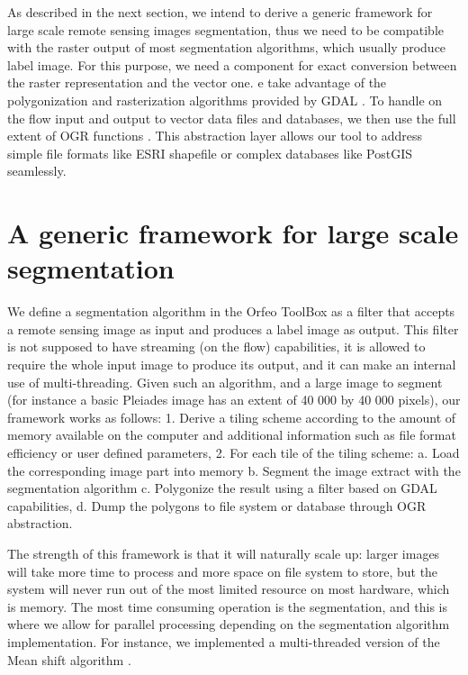 \documentclass{josis}
\begin{document}
As described in the next section, we intend to derive a generic
framework for large scale remote sensing images segmentation, thus we
need to be compatible with the raster output of most segmentation
algorithms, which usually produce label image. For this purpose, we
need a component for exact conversion between the raster
representation and the vector one. e take advantage of the
polygonization and rasterization algorithms provided by GDAL
\cite{}. To handle on the flow input and output to vector data files
and databases, we then use the full extent of OGR functions
\cite{}. This abstraction layer allows our tool to address
simple file formats like ESRI shapefile or complex databases like
PostGIS seamlessly.

\section{A generic framework for large scale segmentation}

We define a segmentation algorithm in the Orfeo ToolBox as a filter
that accepts a remote sensing image as input and produces a label
image as output. This filter is not supposed to have streaming (on the
flow) capabilities, it is allowed to require the whole input image to
produce its output, and it can make an internal use of
multi-threading. Given such an algorithm, and a large image to segment
(for instance a basic Pleiades image \cite{} has an extent of 40
000 by 40 000 pixels), our framework works as follows:
1. Derive a tiling scheme according to the amount of memory available
on the computer and additional information such as file format
efficiency or user defined parameters,
2. For each tile of the tiling scheme:
   a. Load the corresponding image part into memory
   b. Segment the image extract with the segmentation algorithm
   c. Polygonize the result using a filter based on GDAL capabilities,
   d. Dump the polygons to file system or database through OGR
      abstraction.

The strength of this framework is that it will naturally scale up:
larger images will take more time to process and more space on file
system to store, but the system will never run out of the most limited
resource on most hardware, which is memory. The most time consuming
operation is the segmentation, and this is where we allow for parallel
processing depending on the segmentation algorithm implementation. For
instance, we implemented a multi-threaded version of the Mean shift
algorithm \cite{Comaniciu2002mean}.
 
\end{document}
